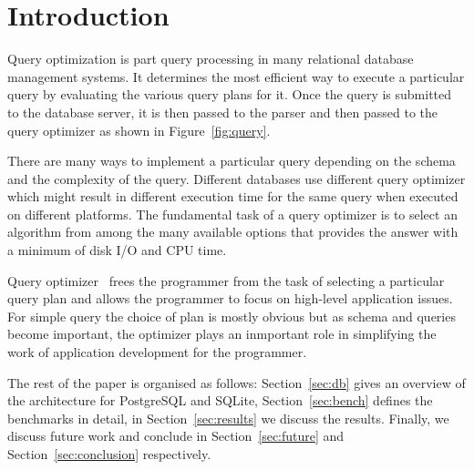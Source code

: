 
\section{Introduction}
\label{sec:intro}


Query optimization is part query processing in many relational database management systems. It determines the most efficient way to execute a particular query by evaluating the various query plans for it. Once the query is submitted to the database server, it is then passed to the parser and then passed to the query optimizer as shown in Figure~\ref{fig:query}.

There are many ways to implement a particular query depending on the schema and the complexity of the query. Different databases use different query optimizer which might result in different execution time for the same query when executed on different platforms. The fundamental task of a query optimizer is to select an algorithm from among the many available options that provides the answer with a minimum of disk I/O and CPU time.

Query optimizer~\cite{ref:sqlite3} frees the programmer from the task of selecting a particular query plan and allows the programmer to focus on high-level application issues. For simple query the choice of plan is mostly obvious but as schema and queries become important, the optimizer plays an inmportant role in simplifying the work of application development for the programmer.

The rest of the paper is organised as follows: Section~\ref{sec:db} gives an overview of the architecture for PostgreSQL and SQLite, Section~\ref{sec:bench} defines the benchmarks in detail, in Section~\ref{sec:results} we discuss the results. Finally, we discuss future work and conclude in Section~\ref{sec:future} and Section~\ref{sec:conclusion} respectively. 


